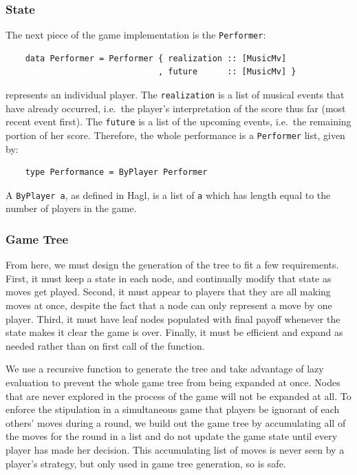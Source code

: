\documentclass{article}
\begin{document}
\subsubsection{State}
The next piece of the game implementation is the \texttt{Performer}:

\begin{verbatim}
    data Performer = Performer { realization :: [MusicMv]
                               , future      :: [MusicMv] }
\end{verbatim}

represents an individual player. The 
\texttt{realization} is
a list of musical events that have already occurred, i.e.~the player's
interpretation of the score thus far (most recent event first). The
\texttt{future} is a list of the upcoming events, i.e.~the remaining portion of
her score. Therefore, the whole performance is a \texttt{Performer} list, given by:

\begin{verbatim}
    type Performance = ByPlayer Performer
\end{verbatim}

A \texttt{ByPlayer a}, as defined in Hagl, is a list of \texttt{a} which
has length equal to the number of players in the game.

\subsubsection{Game Tree}
From here, we must design the generation of the tree to fit a few
requirements. First, it must keep a state in each node, and continually
modify that state as moves get played. Second, it must appear to players
that they are all making moves at once, despite the fact that a node can
only represent a move by one player. Third, it must have leaf nodes
populated with final payoff whenever the state makes it clear the game
is over. Finally, it must be efficient and expand as needed rather than
on first call of the function.

We use a recursive function to generate the tree and take advantage of
lazy evaluation to prevent the whole game tree from being expanded at
once. Nodes that are never explored in the process of the game will
not be expanded at all. To enforce the stipulation in a simultaneous
game that players be ignorant of each others' moves during a round, 
we build out the game tree by accumulating all of the moves for
the round in a list and do not update the game state until every player
has made her decision. This accumulating list of moves is never seen by
a player's strategy, but only used in game tree generation, so is safe.
\end{document}
